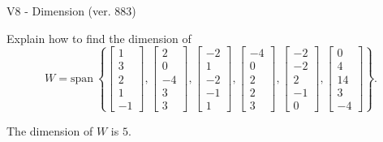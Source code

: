 \begin{exercise}
  \begin{exerciseTitle}V8 - Dimension (ver. 883)\end{exerciseTitle}
  \begin{exerciseStatement}
    Explain how to find the dimension of 
\[W=\mathrm{span}\ \left\{\left[\begin{array}{r}
1 \\
3 \\
2 \\
1 \\
-1
\end{array}\right] , \left[\begin{array}{r}
2 \\
0 \\
-4 \\
3 \\
3
\end{array}\right] , \left[\begin{array}{r}
-2 \\
1 \\
-2 \\
-1 \\
1
\end{array}\right] , \left[\begin{array}{r}
-4 \\
0 \\
2 \\
2 \\
3
\end{array}\right] , \left[\begin{array}{r}
-2 \\
-2 \\
2 \\
-1 \\
0
\end{array}\right] , \left[\begin{array}{r}
0 \\
4 \\
14 \\
3 \\
-4
\end{array}\right]\right\}.\]



  \end{exerciseStatement}
  \begin{exerciseAnswer}
   The dimension of \(W\) is  \(5\).
  


  \end{exerciseAnswer}
\end{exercise}